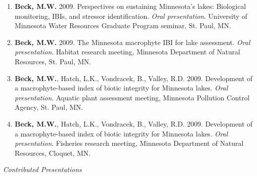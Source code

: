 \documentclass[letterpaper,12pt]{article}
\begin{document}
\begin{enumerate}
\item {\bf Beck, M.W.} 2009. Perspectives on sustaining Minnesota's lakes: Biological monitoring, IBIs, and stressor identification. \textit{Oral presentation}. University of Minnesota Water Resources Graduate Program seminar, St. Paul, MN.

\item {\bf Beck, M.W.} 2009. The Minnesota macrophyte IBI for lake assessment. \textit{Oral presentation}. Habitat research meeting, Minnesota Department of Natural Resources, St. Paul, MN.

\item {\bf Beck, M.W.}, Hatch, L.K., Vondracek, B., Valley, R.D. 2009. Development of a macrophyte-based index of biotic integrity for Minnesota lakes. \textit{Oral presentation}. Aquatic plant assessment meeting, Minnesota Pollution Control Agency, St. Paul, MN.

\item {\bf Beck, M.W.}, Hatch, L.K., Vondracek, B., Valley, R.D. 2009. Development of a macrophyte-based index of biotic integrity for Minnesota lakes. \textit{Oral presentation}. Fisheries research meeting, Minnesota Department of Natural Resources, Cloquet, MN.

\end{enumerate}

\vspace{\baselineskip} 
\centerline{\large{\textit{Contributed Presentations}}}
\end{document}
